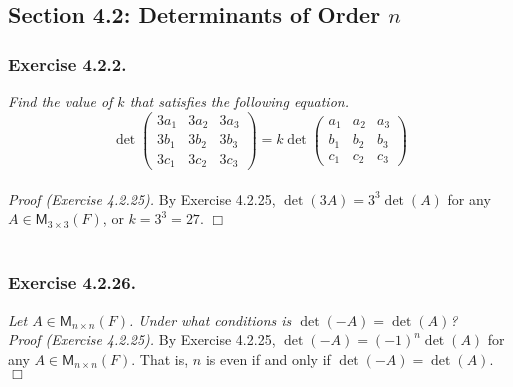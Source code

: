 \documentclass{article}
\begin{document}



\subsection*{Section 4.2: Determinants of Order $n$ \\}



\subsubsection*{Exercise 4.2.2.}
\emph{Find the value of $k$ that satisfies the following equation.
$$\det
  \begin{pmatrix}
    3a_1 & 3a_2 & 3a_3 \\
    3b_1 & 3b_2 & 3b_3 \\
    3c_1 & 3c_2 & 3c_3
  \end{pmatrix}
= k\det
  \begin{pmatrix}
    a_1 & a_2 & a_3 \\
    b_1 & b_2 & b_3 \\
    c_1 & c_2 & c_3
  \end{pmatrix}$$} \\

\emph{Proof (Exercise 4.2.25).}
By Exercise 4.2.25,
$\det(3A) = 3^3 \det(A)$ for any $A \in \mathsf{M}_{3 \times 3}(F)$,
or $k = 3^3 = 27$.
$\Box$ \\\\






\subsubsection*{Exercise 4.2.26.}
\emph{Let $A \in \mathsf{M}_{n \times n}(F)$.
Under what conditions is $\det(-A) = \det(A)$?} \\

\emph{Proof (Exercise 4.2.25).}
By Exercise 4.2.25,
$\det(-A) = (-1)^n \det(A)$ for any $A \in \mathsf{M}_{n \times n}(F)$.
That is, $n$ is even if and only if $\det(-A) = \det(A)$.
$\Box$ \\\\
\end{document}

